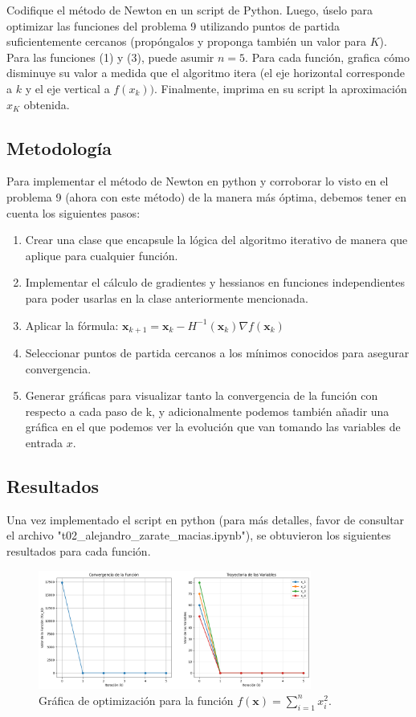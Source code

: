\documentclass{article}
\begin{document}
Codifique el método de Newton en un script de Python. Luego, úselo para optimizar las funciones del problema 9 utilizando puntos de partida suficientemente cercanos (propóngalos y proponga también un valor para $K$). Para las funciones (1) y (3), puede asumir $n = 5$. Para cada función, grafica cómo disminuye su valor a medida que el algoritmo itera (el eje horizontal corresponde a $k$ y el eje vertical a $f(x_k))$. Finalmente, imprima en su script la aproximación $x_K$ obtenida.

\subsection{Metodología}

Para implementar el método de Newton en python y corroborar lo visto en el problema 9 (ahora con este método) de la manera más óptima, debemos tener en cuenta los siguientes pasos:
\begin{enumerate}
    \item Crear una clase que encapsule la lógica del algoritmo iterativo de manera que aplique para cualquier función.
    \item Implementar el cálculo de gradientes y hessianos en funciones independientes para poder usarlas en la clase anteriormente mencionada.
    \item Aplicar la fórmula: $\mathbf{x}_{k+1} = \mathbf{x}_{k} - H^{-1}(\mathbf{x}_k) \nabla f(\mathbf{x}_k)$
    \item Seleccionar puntos de partida cercanos a los mínimos conocidos para asegurar convergencia.
    \item Generar gráficas para visualizar tanto la convergencia de la función con respecto a cada paso de k, y adicionalmente podemos también añadir una gráfica en el que podemos ver la evolución que van tomando las variables de entrada $x$.
\end{enumerate}

\subsection{Resultados}
\setcounter{equation}{0}

Una vez implementado el script en python (para más detalles, favor de consultar el archivo "t02\_alejandro\_zarate\_macias.ipynb"), se obtuvieron los siguientes resultados para cada función. 

\begin{figure}[h]
\centering
\includegraphics[width=0.8\textwidth]{images/10_1_plot.png}
\caption{Gráfica de optimización para la función $f(\mathbf{x}) = \sum_{i=1}^{n} x_i^{2}$.}
\label{fig:10_1_optim}
\end{figure}
\end{document}
